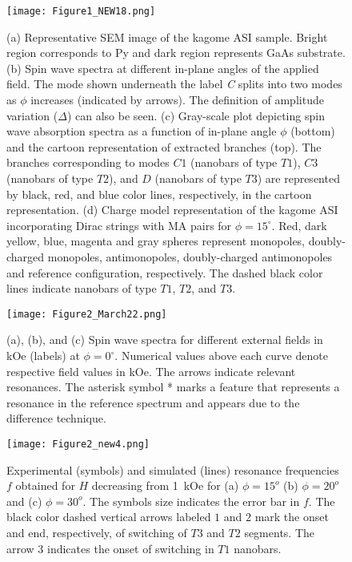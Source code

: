 \documentclass[aps,prl,preprint,showpacs,superscriptaddress,groupedaddress]{revtex4}%
\begin{document}
  \begin{figure}
  	\texttt{[image: Figure1\_NEW18.png]}
  	\begin{flushleft}
  		\caption{(a) Representative SEM image of the kagome ASI sample. Bright region corresponds to Py and dark region represents GaAs substrate. (b) Spin wave spectra at different in-plane angles of the applied field. The mode shown underneath the label \textit{C} splits into two modes as $\phi$ increases (indicated by arrows). The definition of amplitude variation ($\Delta$) can also be seen. (c) Gray-scale  plot  depicting spin wave absorption spectra   as a function of in-plane angle $ \phi $  (bottom)  and the cartoon representation of  extracted branches (top). The branches corresponding to modes $C1$ (nanobars of type $T1$), $C3$ (nanobars of type $T2$), and $D$ (nanobars of type $T3$) are represented by black, red, and blue color lines, respectively, in the cartoon representation.  (d)  Charge model representation of the kagome ASI incorporating Dirac strings with MA pairs for $\phi=15^{\circ}$.  Red, dark yellow, blue, magenta and gray spheres represent monopoles, doubly-charged monopoles, antimonopoles, doubly-charged antimonopoles and reference configuration, respectively. The dashed black color lines indicate nanobars of type $T1$, $T2$, and $T3$.  }
  	\end{flushleft}
  \end{figure}
\begin{figure}
	\texttt{[image: Figure2\_March22.png]}
	\begin{flushleft}
		\caption{ (a), (b), and (c) Spin wave spectra for different external fields in kOe (labels) at $\phi=0^{\circ}$. Numerical values above each curve denote respective field values in kOe. The arrows indicate relevant resonances. The asterisk symbol \textsc{}*\textsc{} marks a feature that represents a resonance in the reference spectrum and appears due to the difference technique.}
	\end{flushleft}
\end{figure}
\begin{figure}	
	\texttt{[image: Figure2\_new4.png]}
	\begin{flushleft}
		\caption{ Experimental (symbols) and simulated (lines) resonance frequencies $f$ obtained for $H$ decreasing from 1~kOe for (a) $\phi = 15^{o}$ (b) $\phi = 20^{o}$ and (c) $\phi = 30^{o}$. The symbols size indicates the error bar in $f$. The black color dashed vertical arrows labeled $ 1 $ and $2$ mark the onset and end, respectively, of switching of $T3$ and $T2$ segments. The arrow $ 3 $ indicates the onset of switching in $T1$ nanobars.  }
	\end{flushleft}
\end{figure}
\end{document}
